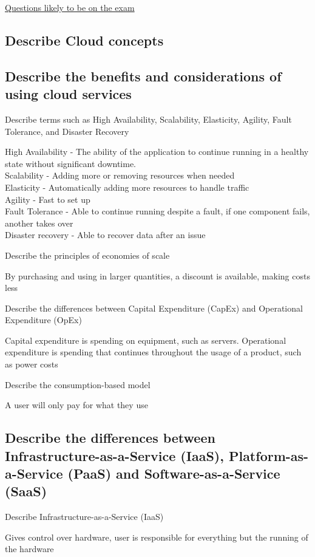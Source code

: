 \documentclass[addpoints]{exam}
\begin{document}
\begin{center}
	\underline{\huge Questions likely to be on the exam}
\end{center}
\begin{questions}
\section{Describe Cloud concepts}
\subsection{Describe the benefits and considerations of using cloud services}
\question Describe terms such as High Availability, Scalability, Elasticity, Agility, Fault Tolerance, and Disaster Recovery
\begin{solution}[2in]
	High Availability - The ability of the application to continue running in a healthy state without significant downtime.\\
	Scalability - Adding more or removing resources when needed\\
	Elasticity - Automatically adding more resources to handle traffic\\
	Agility - Fast to set up\\
	Fault Tolerance - Able to continue running despite a fault, if one component fails, another takes over\\
	Disaster recovery - Able to recover data after an issue
\end{solution}
\question Describe the principles of economies of scale
\begin{solution}[2in]
	By purchasing and using in larger quantities, a discount is available, making costs less
\end{solution}
\question Describe the differences between Capital Expenditure (CapEx) and Operational Expenditure (OpEx)
\begin{solution}[2in]
	Capital expenditure is spending on equipment, such as servers. Operational expenditure is spending that continues throughout the usage of a product, such as power costs
\end{solution}
\question Describe the consumption-based model
\begin{solution}[2in]
	A user will only pay for what they use
\end{solution}
\subsection{Describe the differences between Infrastructure-as-a-Service (IaaS), Platform-as-a-Service (PaaS) and Software-as-a-Service (SaaS)}
\question Describe Infrastructure-as-a-Service (IaaS)
\begin{solution}[2in]
	Gives control over hardware, user is responsible for everything but the running of the hardware
\end{solution}


\end{questions}
\end{document}
